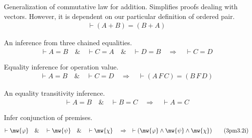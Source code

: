 \begin{lemma} Generalization of commutative law for
addition.  Simplifies proofs dealing
     with vectors.  However, it is dependent on our particular definition of
     ordered pair.  
\begin{align}
\vdash ( A + B ) = ( B + A )\label{eq:addcomgi}\tag{addcomgi}
\end{align}
\end{lemma}


\begin{lemma} An inference from three chained equalities.
\begin{align}
\vdash A = B\quad\&\quad \vdash C = A\quad\&\quad \vdash D =
    B\quad\Rightarrow\quad \vdash C = D\label{eq:3eqtr4i}\tag{3eqtr4i}
\end{align}
\end{lemma}


\begin{lemma} Equality inference for operation value. 
\begin{align}
\vdash A = B\quad\&\quad \vdash C = D\quad\Rightarrow\quad \vdash ( A \,F \,C )
    = ( B \,F \,D )\label{eq:oveq12i}\tag{oveq12i}
\end{align}
\end{lemma}


\begin{lemma} An equality transitivity inference. 
\begin{align}
\vdash A = B\quad\&\quad \vdash B = C\quad\Rightarrow\quad \vdash A =
    C\label{eq:eqtri}\tag{eqtri}
\end{align}
\end{lemma}


\begin{lemma} Infer conjunction of premises. 
\begin{align}
\vdash \mw{\varphi}\quad\&\quad \vdash \mw{\psi}\quad\&\quad \vdash
    \mw{\chi}\quad\Rightarrow\quad \vdash ( \mw{\varphi} \wedge \mw{\psi}
    \wedge \mw{\chi} )\label{eq:3pm3.2i}\tag{3pm3.2i}
\end{align}
\end{lemma}


